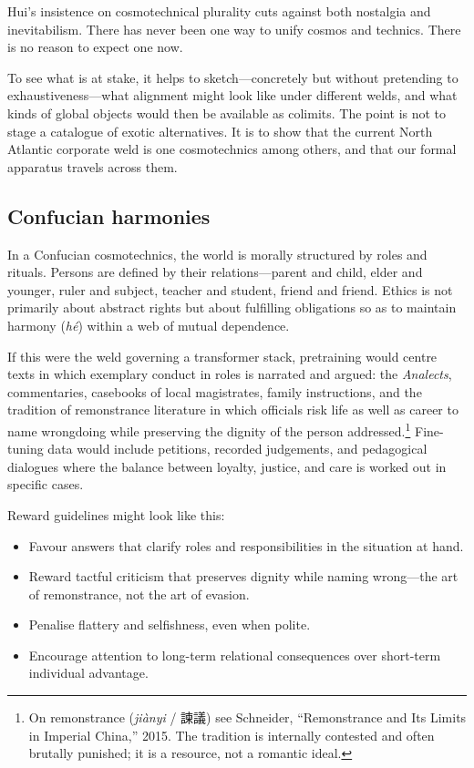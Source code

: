 \documentclass[12pt,a4paper]{article}
\begin{document}
Hui's insistence on cosmotechnical plurality cuts against both nostalgia and inevitabilism. There has never been one way to unify cosmos and technics. There is no reason to expect one now.

To see what is at stake, it helps to sketch---concretely but without pretending to exhaustiveness---what alignment might look like under different welds, and what kinds of global objects would then be available as colimits. The point is not to stage a catalogue of exotic alternatives. It is to show that the current North Atlantic corporate weld is one cosmotechnics among others, and that our formal apparatus travels across them.

\subsection{Confucian harmonies}

In a Confucian cosmotechnics, the world is morally structured by roles and rituals. Persons are defined by their relations---parent and child, elder and younger, ruler and subject, teacher and student, friend and friend. Ethics is not primarily about abstract rights but about fulfilling obligations so as to maintain harmony (\emph{h\'e}) within a web of mutual dependence.

If this were the weld governing a transformer stack, pretraining would centre texts in which exemplary conduct in roles is narrated and argued: the \emph{Analects}, commentaries, casebooks of local magistrates, family instructions, and the tradition of remonstrance literature in which officials risk life as well as career to name wrongdoing while preserving the dignity of the person addressed.\footnote{On remonstrance (\emph{ji\`anyi} / 諫議) see Schneider, ``Remonstrance and Its Limits in Imperial China,'' 2015. The tradition is internally contested and often brutally punished; it is a resource, not a romantic ideal.} Fine-tuning data would include petitions, recorded judgements, and pedagogical dialogues where the balance between loyalty, justice, and care is worked out in specific cases.

Reward guidelines might look like this:

\begin{itemize}
  \item Favour answers that clarify roles and responsibilities in the situation at hand.
  \item Reward tactful criticism that preserves dignity while naming wrong---the art of remonstrance, not the art of evasion.
  \item Penalise flattery and selfishness, even when polite.
  \item Encourage attention to long-term relational consequences over short-term individual advantage.
\end{itemize}
\end{document}
